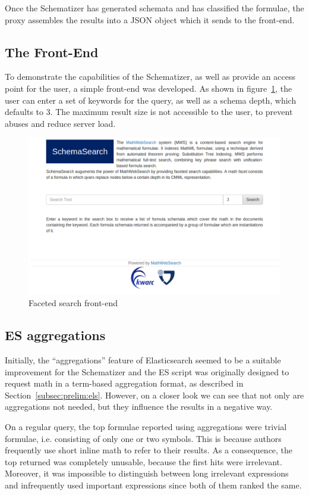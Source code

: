 \documentclass[a4paper,11pt,oneside]{article}
\begin{document}
Once the Schematizer has generated schemata and has classified the formulae,
the proxy assembles the results into a JSON object which it sends to the
front-end.

\subsection{The Front-End}\label{subsec:frontend}
To demonstrate the capabilities of the Schematizer, as well as provide an
access point for the user, a simple front-end was developed.
As shown in figure~\ref{fig:frontend}, the user can enter a set of keywords for
the query, as well as a schema depth, which defaults to 3. The maximum result
size is not accessible to the user, to prevent abuses and reduce server load.

\begin{figure}[ht]\centering
    \includegraphics[width=12.8cm]{img/frontend.png}
    \caption{Faceted search front-end}\label{fig:frontend}
\end{figure}

\subsection{ES aggregations}\label{subsec:esagg}
Initially, the ``aggregations'' feature of Elasticsearch seemed to be a
suitable improvement for the Schematizer and the ES script was originally
designed to request math in a term-based aggregation format, as described in
Section~\ref{subsec:prelim:els}. However, on a closer look we can see that not
only are aggregations not needed, but they influence the results in a negative
way.

On a regular query, the top formulae reported using aggregations were trivial
formulae, i.e. consisting of only one or two symbols. This is because authors
frequently use short inline math to refer to their results. As a consequence,
the top returned was completely unusable, because the first hits were
irrelevant. Moreover, it was impossible to distinguish between long irrelevant
expressions and infrequently used important expressions since both of them
ranked the same.
\end{document}
